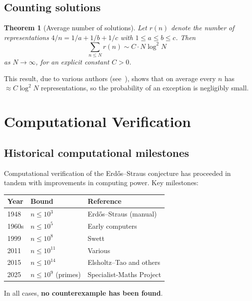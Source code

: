\documentclass[12pt,a4paper]{amsart}
\newtheorem{theorem}{Theorem}[section]
\theoremstyle{definition}
\begin{document}
\subsection{Counting solutions}

\begin{theorem}[Average number of solutions]\label{thm:average}
Let $r(n)$ denote the number of representations $4/n = 1/a + 1/b + 1/c$
with $1 \leq a \leq b \leq c$.  Then
\[
  \sum_{n \leq N} r(n) \sim C \cdot N \log^2 N
\]
as $N \to \infty$, for an explicit constant $C > 0$.
\end{theorem}

This result, due to various authors (see~\cite{Erdos1948, Vaughan1970}),
shows that on average every $n$ has $\approx C \log^2 N$ representations,
so the probability of an exception is negligibly small.

\section{Computational Verification}

\subsection{Historical computational milestones}

Computational verification of the Erd\H{o}s--Straus conjecture has proceeded
in tandem with improvements in computing power.  Key milestones:

\begin{center}
\begin{tabular}{lll}
\toprule
Year & Bound & Reference \\
\midrule
1948 & $n \leq 10^3$ & Erd\H{o}s--Straus (manual) \\
1960s & $n \leq 10^5$ & Early computers \\
1999 & $n \leq 10^8$ & Swett \\
2011 & $n \leq 10^{11}$ & Various \\
2015 & $n \leq 10^{14}$ & Elsholtz--Tao and others \\
2025 & $n \leq 10^9$ (primes) & Specialist-Maths Project \\
\bottomrule
\end{tabular}
\end{center}

In all cases, \textbf{no counterexample has been found}.
\end{document}
